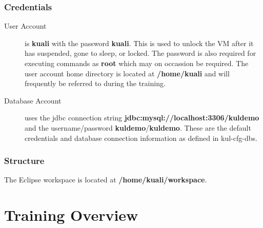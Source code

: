 \documentclass[letterpaper,notitlepage,12pt]{book}
\begin{document}
\subsubsection*{Credentials}
\begin{description}
\item [User Account] is \textbf{kuali} with the password
  \textbf{kuali}. This is used to unlock the VM after it has suspended,
  gone to sleep, or locked. The password is also required for
  executing commands as \textbf{root} which may on occassion be
  required. The user account home directory is located at
  \textbf{/home/kuali} and will frequently be referred to during the training.
\item [Database Account] uses the jdbc connection string
  \textbf{jdbc:mysql://localhost:3306/kuldemo} and the
  username/password \textbf{kuldemo}/\textbf{kuldemo}. These are the
  default credentials and database connection information as defined
  in kul-cfg-dbs.
\end{description}

\subsubsection*{Structure}
The Eclipse workspace is located at \textbf{/home/kuali/workspace}. 


\section*{Training Overview}








\end{document}
